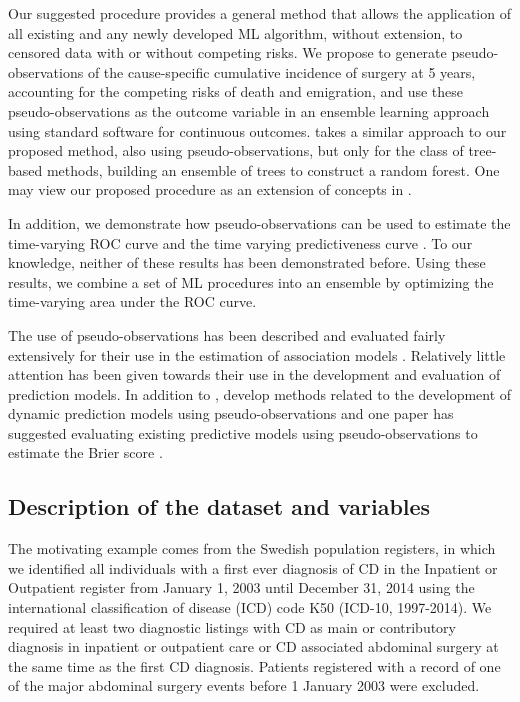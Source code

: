 \documentclass{statsoc}
\begin{document}
Our suggested procedure provides a general method that allows the application of all existing and any newly developed ML algorithm, without extension, to censored data with or without competing risks. We propose to generate pseudo-observations of the cause-specific cumulative incidence of surgery at 5 years, accounting for the competing risks of death and emigration, and use these pseudo-observations as the outcome variable in an ensemble learning approach using standard software for continuous outcomes. \citet{mogensen2013random} takes a similar approach to our proposed method, also using pseudo-observations, but only for the class of tree-based methods, building an ensemble of trees to construct a random forest. One may view our proposed procedure as an extension of concepts in \citet{mogensen2013random}. 

In addition, we demonstrate how pseudo-observations can be used to estimate the time-varying ROC curve \citep{zheng2012evaluating, heagerty2000time} and the time varying predictiveness curve  \citep{pepe2007integrating}. To our knowledge, neither of these results has been demonstrated before. Using these results, we combine a set of ML procedures into an ensemble by optimizing the time-varying area under the ROC curve.  

 The use of pseudo-observations has been described and evaluated fairly extensively for their use in the estimation of association models \citep{andersen2003generalised, andersen2010pseudo}. Relatively little attention has been given towards their use in the development and evaluation of prediction models. In addition to \citet{mogensen2013random}, \citet{nicolaie2013dynamic} develop methods related to the development of dynamic prediction models using pseudo-observations and one paper has suggested evaluating existing predictive models using pseudo-observations to estimate the Brier score \citep{cortese2013comparing}.  

\subsection{Description of the dataset and variables}
The motivating example comes from the Swedish population registers, in which we identified all individuals with a first ever diagnosis of CD in the Inpatient or Outpatient register from January 1, 2003 until December 31, 2014 using the international classification of disease (ICD) code K50 (ICD-10, 1997-2014). We required at least two diagnostic listings with CD as main or contributory diagnosis in inpatient or outpatient care or CD associated abdominal surgery at the same time as the first CD diagnosis. Patients registered with a record of one of the major abdominal surgery events before 1 January 2003 were excluded.
\end{document}
